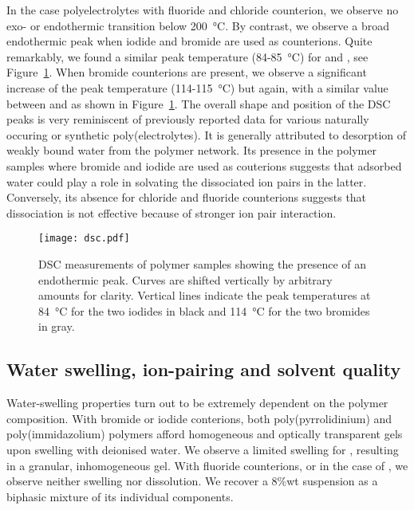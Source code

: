 \documentclass[journal=jacsat,manuscript=article]{achemso}
\begin{document}
In the case polyelectrolytes with fluoride and chloride counterion, we observe no exo- or endothermic transition below \SI{200}{\celsius}. By contrast, we observe a broad endothermic peak when iodide and bromide are used as counterions. Quite remarkably, we found a similar peak temperature (84-\SI{85}{\celsius}) for  and , see Figure~\ref{fig:dsc}. When bromide counterions are present, we observe a significant increase of the peak temperature (114-\SI{115}{\celsius}) but again, with a similar value between  and  as shown in Figure~\ref{fig:dsc}. The overall shape and position of the DSC peaks is very reminiscent of previously reported data for various naturally occuring or synthetic poly(electrolytes)\cite{Li2005,Sarmento2006,Ostrowska-Czubenko2009a,Moin2015}. It is generally attributed to desorption of weakly bound water from the polymer network. Its presence in the polymer samples where bromide and iodide are used as couterions suggests that adsorbed water could play a role in solvating the dissociated ion pairs in the latter. Conversely, its absence for chloride and fluoride counterions suggests that dissociation is not effective because of stronger ion pair interaction.

\begin{figure}
\texttt{[image: dsc.pdf]}
\caption{DSC measurements of polymer samples showing the presence of an endothermic peak. Curves are shifted vertically by arbitrary amounts for clarity. Vertical lines indicate the peak temperatures at \SI{84}{\celsius} for the two iodides in black and \SI{114}{\celsius} for the two bromides in gray.}
\label{fig:dsc}
\end{figure}

\subsection{Water swelling, ion-pairing and solvent quality}
Water-swelling properties turn out to be extremely dependent on the polymer composition. With bromide or iodide conterions, both poly(pyrrolidinium) and poly(immidazolium) polymers afford homogeneous and optically transparent gels upon swelling with deionised water. We observe a limited swelling for , resulting in a granular, inhomogeneous gel. With fluoride counterions, or in the case of , we observe neither swelling nor dissolution. We recover a 8\%wt suspension as a biphasic mixture of its individual components.
\end{document}
